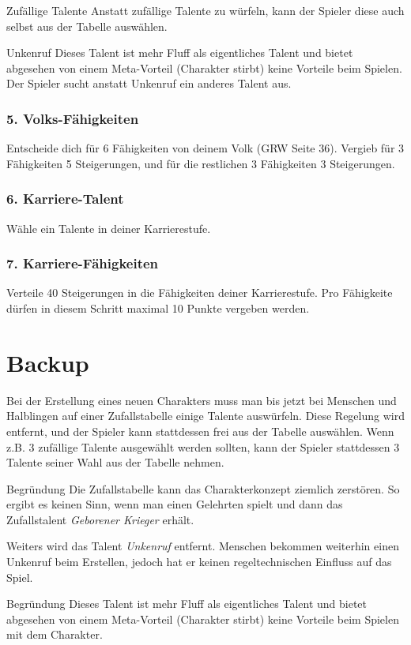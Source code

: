 \documentclass[a4paper,10pt,twoside,twocolumn,openany,nodeprecatedcode,bg=print]{dndbook}
\begin{document}
\begin{DndComment}{Zufällige Talente}
  Anstatt zufällige Talente zu würfeln, kann der Spieler diese auch selbst aus der Tabelle auswählen.
\end{DndComment}

\begin{DndComment}{Unkenruf}
  Dieses Talent ist mehr Fluff als eigentliches Talent und bietet abgesehen von einem Meta-Vorteil (Charakter stirbt) keine Vorteile beim Spielen.
  Der Spieler sucht anstatt Unkenruf ein anderes Talent aus.
\end{DndComment}

\subsection[]{5. Volks-Fähigkeiten}
Entscheide dich für 6 Fähigkeiten von deinem Volk (GRW Seite 36). 
Vergieb für 3 Fähigkeiten 5 Steigerungen, und für die restlichen 3 Fähigkeiten 3 Steigerungen.

\subsection[]{6. Karriere-Talent}
Wähle ein Talente in deiner Karrierestufe. 

\subsection[]{7. Karriere-Fähigkeiten}
Verteile 40 Steigerungen in die Fähigkeiten deiner Karrierestufe.
Pro Fähigkeite dürfen in diesem Schritt maximal 10 Punkte vergeben werden.

\chapter[short]{Backup}

Bei der Erstellung eines neuen Charakters muss man bis jetzt bei Menschen und Halblingen auf einer Zufallstabelle einige Talente auswürfeln.
Diese Regelung wird entfernt, und der Spieler kann stattdessen frei aus der Tabelle auswählen. Wenn z.B. 3 zufällige Talente ausgewählt werden sollten, kann der Spieler stattdessen 3 Talente seiner Wahl aus der Tabelle nehmen.

\begin{DndComment}{Begründung}
  Die Zufallstabelle kann das Charakterkonzept ziemlich zerstören. So ergibt es keinen Sinn, wenn man einen Gelehrten spielt und dann das Zufallstalent \textit{Geborener Krieger} erhält.
\end{DndComment}

Weiters wird das Talent \textit{Unkenruf} entfernt. 
Menschen bekommen weiterhin einen Unkenruf beim Erstellen, jedoch hat er keinen regeltechnischen Einfluss auf das Spiel.

\begin{DndComment}{Begründung}
  Dieses Talent ist mehr Fluff als eigentliches Talent und bietet abgesehen von einem Meta-Vorteil (Charakter stirbt) keine Vorteile beim Spielen mit dem Charakter.
\end{DndComment}
\end{document}
